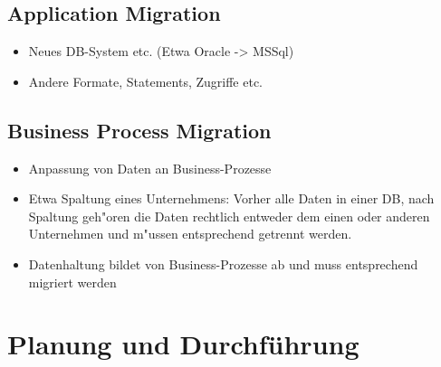 \documentclass[11pt]{scrartcl}
\begin{document}
\subsection{Application Migration}

\begin{itemize}
	\item Neues DB-System etc. (Etwa Oracle -> MSSql)
	\item Andere Formate, Statements, Zugriffe etc.
\end{itemize}

\subsection{Business Process Migration}

\begin{itemize}
	\item Anpassung von Daten an Business-Prozesse
	\item Etwa Spaltung eines Unternehmens: Vorher alle Daten in einer DB, nach Spaltung geh"oren die Daten rechtlich entweder dem einen oder anderen Unternehmen und m"ussen entsprechend getrennt werden.
	\item Datenhaltung bildet von Business-Prozesse ab und muss entsprechend migriert werden
\end{itemize}

\section{Planung und Durchführung}			%
\end{document}
